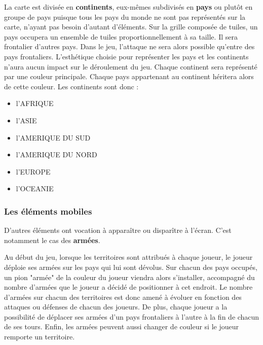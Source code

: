 La carte est divisée en \textbf{continents}, eux-mêmes subdivisés en \textbf{pays} ou plutôt en groupe de pays puisque tous les pays du monde ne sont pas représentés sur la carte, n'ayant pas besoin d'autant d'éléments. Sur la grille composée de tuiles, un pays occupera un ensemble de tuiles proportionnellement à sa taille. Il sera frontalier d'autres pays. Dans le jeu, l'attaque ne sera alors possible qu'entre des pays frontaliers. L'esthétique choisie pour représenter les pays et les continents n'aura aucun impact sur le déroulement du jeu. Chaque continent sera représenté par une couleur principale. Chaque pays appartenant au continent héritera alors de cette couleur. 
\newline
\newline 
Les continents sont donc :
\begin{itemize}
    \item l'AFRIQUE
    \item l'ASIE
    \item l'AMERIQUE DU SUD 
    \item l'AMERIQUE DU NORD 
    \item l'EUROPE 
    \item l'OCEANIE \newline
\end{itemize}



\subsubsection{Les éléments mobiles}

D'autres éléments ont vocation à apparaître ou disparître à l'écran. C'est notamment le cas des \textbf{armées}. 
\newline 

Au début du jeu, lorsque les territoires sont attribués à chaque joueur, le joueur déploie ses armées sur les pays qui lui sont dévolus. Sur chacun des pays occupés, un pion "armée" de la couleur du joueur viendra alors s'installer, accompagné du nombre d'armées que le joueur a décidé de positionner à cet endroit. Le nombre d'armées sur chacun des territoires est donc amené à évoluer en fonction des attaques ou défenses de chacun des joueurs. De plus, chaque joueur a la possibilité de déplacer ses armées d'un pays frontaliers à l'autre à la fin de chacun de ses tours. Enfin, les armées peuvent aussi changer de couleur si le joueur remporte un territoire. 

